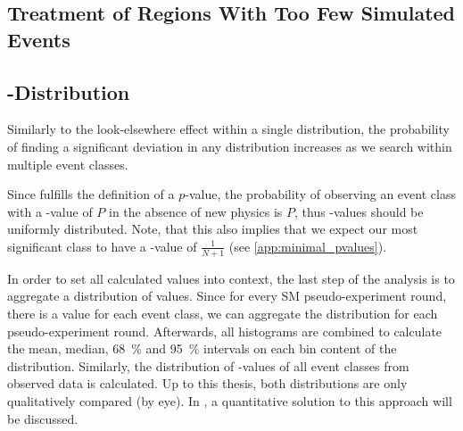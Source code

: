 

\subsection{Treatment of Regions With Too Few Simulated Events}

\subsection{\ptilde-Distribution}
Similarly to the look-elsewhere effect within a single distribution, the probability of finding a significant deviation in any distribution increases as we search within multiple event classes.

Since \ptilde fulfills the definition of a $p$-value, the probability of observing an event class with a \ptilde-value of $P$ in the absence of new physics is $P$, thus \ptilde-values should be uniformly distributed. Note, that this also implies that we expect our most significant class to have a \ptilde-value of $\frac{1}{N+1}$ (see \ref{app:minimal_pvalues}).

In order to set all calculated \ptilde values into context, the last step of the analysis is to aggregate a distribution of \ptilde values. Since for every \ac{SM} pseudo-experiment round, there is a \ptilde value for each event class, we can aggregate the distribution for each pseudo-experiment round. Afterwards, all histograms are combined to calculate the mean, median, \SI{68}{\percent} and \SI{95}{\percent} intervals on each bin content of the \ptilde distribution. Similarly, the distribution of \ptilde-values of all event classes from observed data is calculated. Up to this thesis, both distributions are only qualitatively compared (by eye). In , a quantitative solution to this approach will be discussed.

